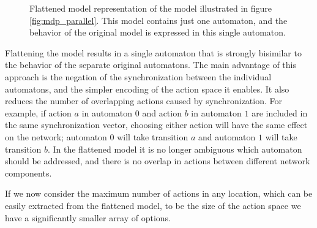 \begin{figure}
  \centering
  \caption{Flattened model representation of the model illustrated in figure \ref{fig:mdp_parallel}. This model contains just one automaton, and the behavior of the original model is expressed in this single automaton.}
  \label{fig:mdp_flattened}
\end{figure}

Flattening the model results in a single automaton that is strongly bisimilar to the behavior of the separate original automatons. The main advantage of this approach is the negation of the synchronization between the individual automatons, and the simpler encoding of the action space it enables. It also reduces the number of overlapping actions caused by synchronization. For example, if action $a$ in automaton $0$ and action $b$ in automaton $1$ are included in the same synchronization vector, choosing either action will have the same effect on the network; automaton $0$ will take transition $a$ and automaton $1$ will take transition $b$. In the flattened model it is no longer ambiguous which automaton should be addressed, and there is no overlap in actions between different network components.

If we now consider the maximum number of actions in any location, which can be easily extracted from the flattened model, to be the size of the action space we have a significantly smaller array of options.

